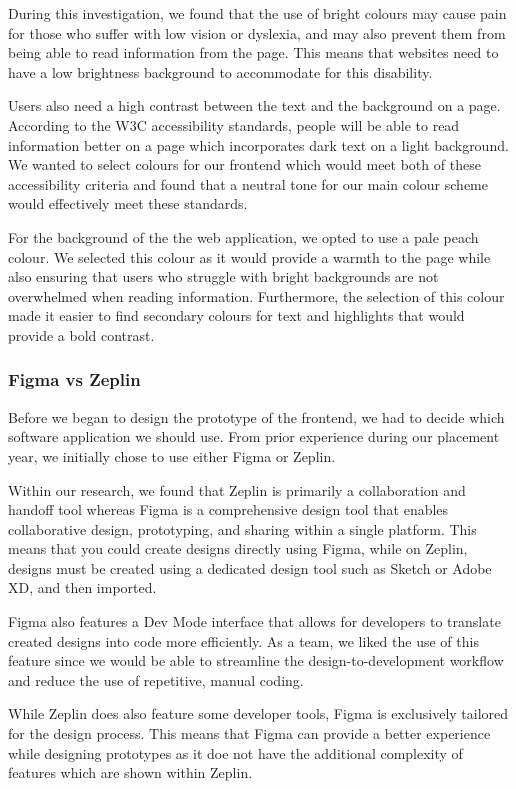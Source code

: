 \documentclass{article}
\begin{document}
    During this investigation, we found that the use of bright colours may cause pain for those who suffer with low vision or dyslexia, and may also prevent them from being able to read information from the page. This means that websites need to have a low brightness background to accommodate for this disability.
    
    Users also need a high contrast between the text and the background on a page. According to the W3C accessibility standards, people will be able to read information better on a page which incorporates dark text on a light background. We wanted to select colours for our frontend which would meet both of these accessibility criteria and found that a neutral tone for our main colour scheme would effectively meet these standards.
    
    For the background of the the web application, we opted to use a pale peach colour. We selected this colour as it would provide a warmth to the page while also ensuring that users who struggle with bright backgrounds are not overwhelmed when reading information. Furthermore, the selection of this colour made it easier to find secondary colours for text and highlights that would provide a bold contrast.

    \subsubsection{Figma vs Zeplin}
    Before we began to design the prototype of the frontend, we had to decide which software application we should use. From prior experience during our placement year, we initially chose to use either Figma or Zeplin.

    Within our research, we found that Zeplin is primarily a collaboration and handoff tool whereas Figma is a comprehensive design tool that enables collaborative design, prototyping, and sharing within a single platform. This means that you could create designs directly using Figma, while on Zeplin, designs must be created using a dedicated design tool such as Sketch or Adobe XD, and then imported. 
    
    Figma also features a Dev Mode interface that allows for developers to translate created designs into code more efficiently. As a team, we liked the use of this feature since we would be able to streamline the design-to-development workflow and reduce the use of repetitive, manual coding.
    
    While Zeplin does also feature some developer tools, Figma is exclusively tailored for the design process. This means that Figma can provide a better experience while designing prototypes as it doe not have the additional complexity of features which are shown within Zeplin. 
\end{document}
